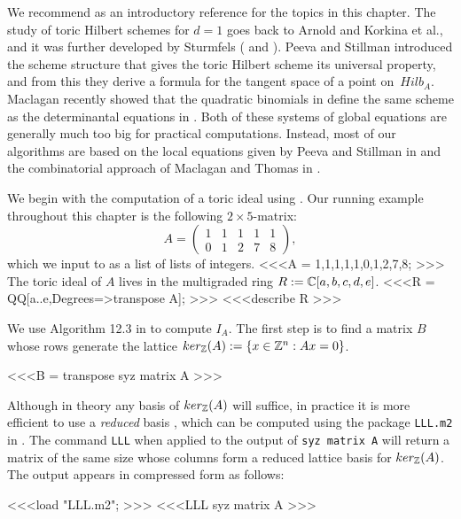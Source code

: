 We recommend \cite[\S 4, \S 10]{HS:St2} as an introductory reference for the 
topics in this chapter.
The study of toric Hilbert schemes for $d=1$ goes back to
Arnold \cite{HS:Arn} and Korkina et al.\cite{HS:KPR}, and it was
further developed by Sturmfels  (\cite{HS:St1} and \cite[\S 10]{HS:St2}). 
Peeva and Stillman \cite{HS:PS1} introduced the scheme structure 
that gives the toric Hilbert scheme its universal property,
and from this they derive a formula for the tangent space
of a point on  $\, Hilb_A $. Maclagan recently showed that the 
quadratic binomials in \cite[\S 5]{HS:St1} define the same scheme as the
determinantal equations in \cite{HS:PS1}.
Both of these systems of global equations are 
generally much too big for 
practical computations. Instead, most of our algorithms are based on
the local equations given by Peeva and Stillman in \cite{HS:PS2}
and the combinatorial approach of Maclagan and Thomas in \cite{HS:MT}.

We begin with the computation of a toric ideal using \Mtwo. Our
running example throughout this chapter is the following $2 \times
5$-matrix:
\begin{equation}
\label{OurMatrix}
A = \left( \begin{matrix}
           1 & 1 & 1 & 1 & 1  \\ 
           0 & 1 & 2 & 7 & 8 
\end{matrix} \right),
\end{equation}
which we input to \Mtwo as a list of lists of 
integers.
<<<A = {{1,1,1,1,1},{0,1,2,7,8}}; >>>
The toric ideal of $A$ lives in the multigraded ring $R := \mathbb{C} [a,b,c,d,e]$.
<<<R = QQ[a..e,Degrees=>transpose A]; >>>
<<<describe R >>>

We use Algorithm 12.3 in \cite{HS:St2} to compute $I_A$. The first step is
to find a matrix $B$ whose rows generate the lattice $ker_{\mathbb{Z}}(A)
:= \{x \in \mathbb{Z}^n : Ax = 0 \}$. 

<<<B = transpose syz matrix A >>>

Although in theory any basis of $ker_{\mathbb{Z}}(A)$ will suffice, in
practice it is more efficient to use a {\em reduced} basis
\cite[\S 6.2]{HS:Sch}, which can be computed using the {\em {}} package {\tt LLL.m2} in \Mtwo. The command {\tt LLL} 
when applied to the output of {\tt syz matrix A} will return a 
matrix of the same size whose columns form a reduced lattice basis 
for $ker_{\mathbb{Z}}(A)$. The output appears in compressed form as follows:

<<<load "LLL.m2"; >>>
<<<LLL syz matrix A >>>

